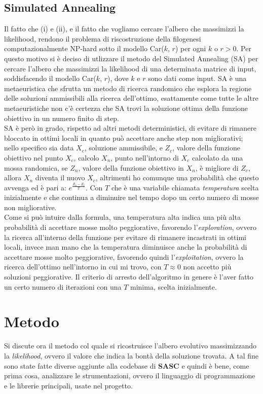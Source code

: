 \documentclass{report}
\begin{document}
\section{Simulated Annealing}
  Il fatto che (i) e (ii), e il fatto che vogliamo cercare l'albero che massimizzi la likelihood, rendono il problema di riscostruzione della filogenesi computazionalmente NP-hard sotto il modello Car($k$, $r$) per ogni $k$ o $r > 0$. Per questo motivo si è deciso di utlizzare il metodo del Simulated Annealing (SA) per cercare l'albero che massimizzi la likelihood di una determinata matrice di input, soddisfacendo il modello Car($k$, $r$), dove $k$ e $r$ sono dati come input.
  SA è una metaeuristica che sfrutta un metodo di ricerca randomico che esplora la regione delle soluzioni ammissibili alla ricerca dell'ottimo, esattamente come tutte le altre metaeuristiche non c'è certezza che SA trovi la soluzione ottima della funzione obiettivo in un numero finito di step.\\
  SA è però in grado, rispetto ad altri metodi deterministici, di evitare di rimanere bloccato in ottimi locali in quanto può accettare anche step non migliorativi; nello specifico sia data $X_{c}$, soluzione ammissibile, e $Z_{c}$, valore della funzione obiettivo nel punto $X_{c}$, calcolo $X_{n}$, punto nell'intorno di $X_{c}$ calcolato da una mossa randomica, se $Z_{n}$, valore della funzione obiettivo in $X_{n}$, è migliore di $Z_{c}$, allora $X_{n}$ diventa il nuovo $X_{c}$, altrimenti ho comunque una probabilità che questo avvenga ed è pari a: $e^{\frac{Z_{n}-Z_{c}}{T}}$.
  Con $T$ che è una variabile chiamata \emph{temperatura} scelta inizialmente e che continua a diminuire nel tempo dopo un certo numero di mosse non migliorative.\\
  Come si può intuire dalla formula, una temperatura alta indica una più alta probabilità di accettare mosse molto peggiorative, favorendo l'\emph{exploration}, ovvero la ricerca all'interno della funzione per evitare di rimanere incastrati in ottimi locali, invece man mano che la temperatura diminuisce anche la probabilità di accettare mosse molto peggiorative, favorendo quindi l'\emph{exploitation}, ovvero la ricerca dell'ottimo nell'intorno in cui mi trovo, con $T\approx 0$ non accetto più soluzioni peggiorative. Il criterio di arresto dell'algoritmo in genere è l'aver fatto un certo numero di iterazioni con una $T$ minima, scelta inizialmente.

\chapter{Metodo}
  Si discute ora il metodo col quale si ricostruisce l'albero evolutivo massimizzando la \emph{likelihood}, ovvero il valore che indica la bontà della soluzione trovata. A tal fine sono state fatte diverse aggiunte alla codebase di \textbf{SASC} e quindi è bene, come prima cosa, analizzare le strumentazioni, ovvero il linguaggio di programmazione e le librerie principali, usate nel progetto.
\end{document}
